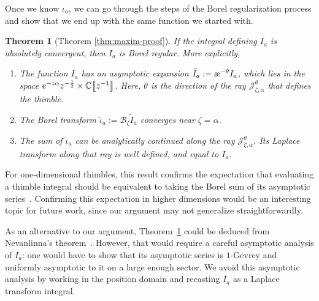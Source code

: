 \documentclass[pdftex]{sigma}
\newcommand{\C}{\mathbb{C}}
\newcommand{\series}[1]{\tilde{#1}}
\newcommand{\borel}{\mathcal{B}}
\newcommand{\aexp}{\text{\rm \ae}}
\numberwithin{equation}{section}
\newtheorem{Theorem}{Theorem}[section]
\begin{document}
Once we know $\iota_a$, we can go through the steps of the Borel regularization process and show that we end up with the same function we started with.
\begin{Theorem}[Theorem \ref{thm:maxim-proof}]\label{thm:maxim}
If the integral defining $I_a$ is absolutely convergent, then $I_a$ is Borel regular. More explicitly,
\begin{enumerate}\itemsep=0pt
\item[$(1)$] %
The function $I_a$ has an asymptotic expansion $\series{I}_a := \aexp^{-\theta} I_a$, which lies in the space ${\rm e}^{-z \alpha} \smash{ z^{-\frac{1}{2}}} \allowbreak\times \C\big\llbracket z^{-1}\big\rrbracket$. Here, $\theta$ is the direction of the ray $\mathcal{J}^\theta_{\zeta, \alpha}$ that defines the thimble.
\item[$(2)$] %
The Borel transform $\series{\iota}_a := \borel_\zeta \series{I}_a$ converges near $\zeta = \alpha$.
\item[$(3)$] %
The sum of $\series{\iota}_a$ can be analytically continued along the ray $\mathcal{J}_{\zeta, \alpha}^\theta$. Its Laplace transform along that ray is well defined, and equal to $I_a$.
\end{enumerate}
\end{Theorem}
For one-dimensional thimbles, this result confirms the expectation that evaluating a thimble integral should be equivalent to taking the Borel sum of its asymptotic series~\cite[Section~2]{dunne-unsal}. Confirming this expectation in higher dimensions would be an interesting topic for future work, since our argument may not generalize straightforwardly.

As an alternative to our argument, Theorem~\ref{thm:maxim} could be deduced from Nevanlinna's theorem~\cite{nevanlinna}. However, that would require a careful asymptotic analysis of $I_a$: one would have to show that its asymptotic series is $1$-Gevrey and uniformly asymptotic to it on a large enough sector. We avoid this asymptotic analysis by working in the position domain and recasting $I_a$ as a Laplace transform integral.
%
\end{document}
